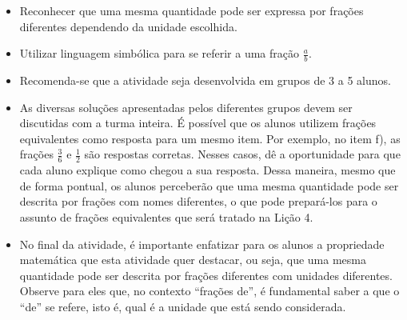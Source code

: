 \newpage
\begin{objetivos}{}{}
\begin{itemize} %
    \item Reconhecer que uma mesma quantidade pode ser expressa por frações diferentes dependendo da unidade escolhida.
    \item Utilizar linguagem simbólica para se referir a uma fração $\frac{a}{b}$.
\end{itemize} %

\end{objetivos}

\begin{orientacoes}
  \begin{itemize} %
    \item       Recomenda-se que a atividade seja desenvolvida em grupos de 3 a 5 alunos.
    \item       As diversas soluções apresentadas pelos diferentes grupos devem ser discutidas com a turma inteira. É possível que os alunos utilizem frações equivalentes como resposta para um mesmo item. Por exemplo, no item f), as frações       $\frac{3}{6}$ e       $\frac{1}{2}$ são respostas corretas. Nesses casos, dê a oportunidade para que cada aluno explique como chegou a sua resposta. Dessa maneira, mesmo que de forma pontual, os alunos perceberão que uma mesma quantidade pode ser descrita por frações com nomes diferentes, o que pode prepará-los para o assunto de frações equivalentes que será tratado na Lição 4.
    \item       No final da atividade, é importante enfatizar para os alunos a propriedade matemática que esta atividade quer destacar, ou seja, que uma mesma quantidade pode ser descrita por frações diferentes com unidades diferentes. Observe para eles que, no contexto ``frações de'', é fundamental saber a que o       ``de''     se refere, isto é, qual é a unidade que está sendo considerada.
\end{itemize} %


  \vspace{.1cm}


\end{orientacoes}

